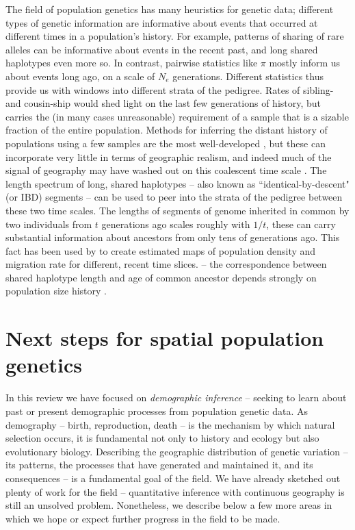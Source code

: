 \documentclass{ar-1col}
\newcommand{\g}[1]{{\color{blue}{#1}}}
\renewcommand{\emph}[1]{{\textit{#1}}}
\begin{document}
The field of population genetics has many heuristics for genetic data; 
different types of genetic information are informative 
about events that occurred at different times in a population's history.
For example, patterns of sharing of rare alleles can be informative about events in the recent past,
and long shared haplotypes even more so.
In contrast, pairwise statistics like $\pi$ \g{or $F_{ST}$} mostly inform us about events long ago,
on a scale of $N_e$ generations.
Different statistics thus provide us with windows into different strata of the pedigree.
Rates of sibling- and cousin-ship 
would shed light on the last few generations of history,
but carries the (in many cases unreasonable) requirement of a sample 
that is a sizable fraction of the entire population.
Methods for inferring the distant history of populations using a few samples
are the most well-developed \citep[e.g.,]{dadi,Li_Durbin2011,momi},
but these can incorporate very little in terms of geographic realism,
and indeed much of the signal of geography 
may have washed out on this coalescent time scale \citep{wilkins2004separationoftimescales}.
The length spectrum of long, shared haplotypes --
also known as ``identical-by-descent" (or IBD) segments --
can be used to peer into the strata of the pedigree between these two time scales.
The lengths of segments of genome inherited in common by two individuals
from $t$ generations ago scales roughly with $1/t$, 
these can carry substantial information about ancestors from only tens of generations ago.
This fact has been used by \citet{alasadi2018estimating}
to create estimated maps of population density and migration rate
for different, recent time slices.
\g{However, the different strata cannot be read independently}
-- the correspondence between shared haplotype length and age of common ancestor
depends strongly on population size history \citep{ralph2013geography}.


\section{Next steps for spatial population genetics}

In this review we have focused on \emph{demographic inference} --
seeking to learn about past or present demographic processes
from population genetic data.
As demography -- birth, reproduction, death -- 
is the mechanism by which natural selection occurs,
it is fundamental not only to history and ecology but also evolutionary biology.
Describing the geographic distribution of genetic variation -- 
its patterns, 
the processes that have generated and maintained it, 
and its consequences -- 
is a fundamental goal of the field.
We have already sketched out plenty of work for the field
-- quantitative inference with continuous geography is still an unsolved problem.
Nonetheless, we describe below a few more areas 
in which we hope or expect further progress in the field to be made.
\end{document}
